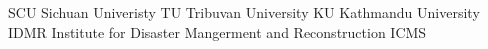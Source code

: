 SCU   Sichuan Univeristy
TU    Tribuvan University
KU    Kathmandu University
IDMR  Institute for Disaster Mangerment and Reconstruction
ICMS
